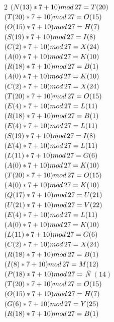 \documentclass{article}
\begin{document}
\begin{enumerate}
\begin{multicols}{2}
 $(N(13)*7+10)mod \thinspace 27 = T (20)$\\
 $(T(20)*7+10)mod \thinspace 27 = O (15)$\\
 $(O(15)*7+10)mod \thinspace 27 = H (7)$\\
 $(S(19)*7+10)mod \thinspace 27 = I (8)$\\
 $(C(2)*7+10)mod \thinspace 27 = X (24)$\\
 $(A(0)*7+10)mod \thinspace 27 = K (10)$\\
 $(R(18)*7+10)mod \thinspace 27 = B (1)$\\
 $(A(0)*7+10)mod \thinspace 27 = K (10)$\\
 $(C(2)*7+10)mod \thinspace 27 = X (24)$\\
 $(T(20)*7+10)mod \thinspace 27 = O (15)$\\
 $(E(4)*7+10)mod \thinspace 27 = L (11)$\\
 $(R(18)*7+10)mod \thinspace 27 = B (1)$\\
 $(E(4)*7+10)mod \thinspace 27 = L (11)$\\
 $(S(19)*7+10)mod \thinspace 27 = I (8)$\\
 $(E(4)*7+10)mod \thinspace 27 = L (11)$\\
 $(L(11)*7+10)mod \thinspace 27 = G (6)$\\
 $(A(0)*7+10)mod \thinspace 27 = K (10)$\\
 $(T(20)*7+10)mod \thinspace 27 = O (15)$\\
 $(A(0)*7+10)mod \thinspace 27 = K (10)$\\
 $(Q(17)*7+10)mod \thinspace 27 = U (21)$\\
 $(U(21)*7+10)mod \thinspace 27 = V (22)$\\
 $(E(4)*7+10)mod \thinspace 27 = L (11)$\\
 $(A(0)*7+10)mod \thinspace 27 = K (10)$\\
 $(L(11)*7+10)mod \thinspace 27 = G (6)$\\
 $(C(2)*7+10)mod \thinspace 27 = X (24)$\\
 $(R(18)*7+10)mod \thinspace 27 = B (1)$\\
 $(I(8)*7+10)mod \thinspace 27 = M (12)$\\
 $(P(18)*7+10)mod \thinspace 27 = $ \textit{Ñ} $ (14)$\\
 $(T(20)*7+10)mod \thinspace 27 = O (15)$\\
 $(O(15)*7+10)mod \thinspace 27 = H (7)$\\
 $(G(6)*7+10)mod \thinspace 27 = Y (25)$\\
 $(R(18)*7+10)mod \thinspace 27 = B (1)$\\

\end{multicols}
\end{enumerate}
\end{document}
